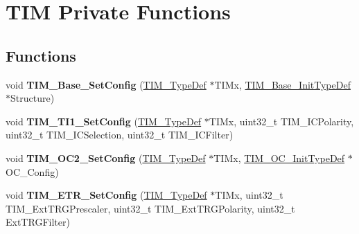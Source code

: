 \hypertarget{group___t_i_m___private___functions}{}\section{T\+IM Private Functions}
\label{group___t_i_m___private___functions}
\subsection*{Functions}
\begin{DoxyCompactItemize}
\item 
\mbox{\label{group___t_i_m___private___functions_ga057e4b4da135186e8fb88327c5fd0684}} 
void {\bfseries T\+I\+M\+\_\+\+Base\+\_\+\+Set\+Config} (\hyperlink{struct_t_i_m___type_def}{T\+I\+M\+\_\+\+Type\+Def} $\ast$T\+I\+Mx, \hyperlink{struct_t_i_m___base___init_type_def}{T\+I\+M\+\_\+\+Base\+\_\+\+Init\+Type\+Def} $\ast$Structure)
\item 
\mbox{\label{group___t_i_m___private___functions_ga83c847710a92f0558c862dd0dc889ff3}} 
void {\bfseries T\+I\+M\+\_\+\+T\+I1\+\_\+\+Set\+Config} (\hyperlink{struct_t_i_m___type_def}{T\+I\+M\+\_\+\+Type\+Def} $\ast$T\+I\+Mx, uint32\+\_\+t T\+I\+M\+\_\+\+I\+C\+Polarity, uint32\+\_\+t T\+I\+M\+\_\+\+I\+C\+Selection, uint32\+\_\+t T\+I\+M\+\_\+\+I\+C\+Filter)
\item 
\mbox{\label{group___t_i_m___private___functions_ga20370137a5c000fa4739d30669e67b8c}} 
void {\bfseries T\+I\+M\+\_\+\+O\+C2\+\_\+\+Set\+Config} (\hyperlink{struct_t_i_m___type_def}{T\+I\+M\+\_\+\+Type\+Def} $\ast$T\+I\+Mx, \hyperlink{struct_t_i_m___o_c___init_type_def}{T\+I\+M\+\_\+\+O\+C\+\_\+\+Init\+Type\+Def} $\ast$O\+C\+\_\+\+Config)
\item 
\mbox{\label{group___t_i_m___private___functions_ga0dc6b90093e2510142a5b21d75e025e0}} 
void {\bfseries T\+I\+M\+\_\+\+E\+T\+R\+\_\+\+Set\+Config} (\hyperlink{struct_t_i_m___type_def}{T\+I\+M\+\_\+\+Type\+Def} $\ast$T\+I\+Mx, uint32\+\_\+t T\+I\+M\+\_\+\+Ext\+T\+R\+G\+Prescaler, uint32\+\_\+t T\+I\+M\+\_\+\+Ext\+T\+R\+G\+Polarity, uint32\+\_\+t Ext\+T\+R\+G\+Filter)
\item 
\mbox{\label{group___t_i_m___private___functions_ga78edd2f05a873d68690d8658aa427ccf}} 

\end{DoxyCompactItemize}
